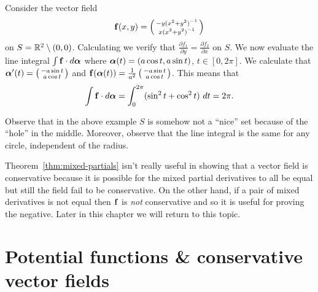 \begin{example}
    Consider the vector field
    \[
        \mathbf{f}(x,y) = \left(\begin{smallmatrix}
                -y {(x^2 + y^2)}^{-1} \\ x {(x^2 + y^2)}^{-1}
            \end{smallmatrix}\right)
    \]
    on \(S = \mathbb{R}^2 \setminus (0,0)\).
    Calculating we verify that  \(  \tfrac{\partial f_1}{\partial y} = \tfrac{\partial f_2}{\partial x}\) on \(S\).
    We now evaluate the line integral \(\int \mathbf{f} \cdot d\boldsymbol{\alpha}\) where \(\boldsymbol{\alpha}(t) = (a \cos t, a \sin t)\), \(t\in [0,2\pi]\).
    We calculate that
    \(\boldsymbol{\alpha}'(t) = \left(\begin{smallmatrix}
            -a \sin t \\ a \cos t
        \end{smallmatrix}\right)\) and \(\mathbf{f}(\boldsymbol{\alpha}(t)) = \frac{1}{a^2} \left(\begin{smallmatrix}
            -a \sin t \\ a \cos t
        \end{smallmatrix}\right)   \).
    This means that
    \[
        \int \mathbf{f} \cdot d\boldsymbol{\alpha} = \int_{0}^{2\pi} ( \sin^2 t + \cos^2 t )\ dt = 2\pi.
    \]
\end{example}
Observe that in the above example \(S\) is somehow not a ``nice'' set because of the ``hole'' in the middle.
Moreover, observe that the line integral is the same for any circle, independent of the radius.

Theorem~\ref{thm:mixed-partials} isn't really useful in showing that a vector field is conservative because it is possible for the mixed partial derivatives to all be equal but still the field fail to be conservative.
On the other hand, if a pair of mixed derivatives is not equal then \(\mathbf{f}\) is \emph{not} conservative and so it is useful for proving the negative.
Later in this chapter we will return to this topic.

\section{Potential functions \& conservative vector fields}

